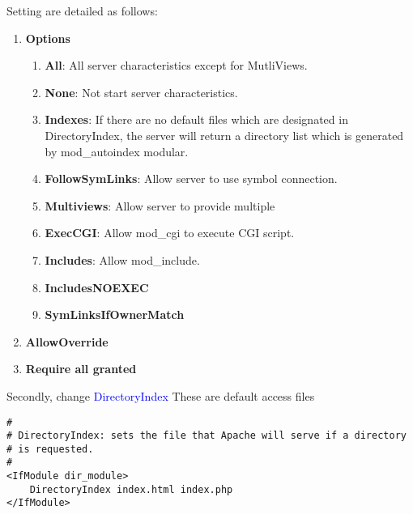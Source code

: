Setting are detailed as follows:
\begin{enumerate}
\item{\textbf{Options}
\begin{enumerate}
\item \textbf{All}: All server characteristics except for MutliViews.
\item \textbf{None}: Not start server characteristics.
\item \textbf{Indexes}: If there are no default files which are designated in DirectoryIndex, the server will return a directory list which is generated by mod\_autoindex modular.
\item \textbf{FollowSymLinks}: Allow server to use symbol connection.
\item \textbf{Multiviews}: Allow server to provide multiple 
\item \textbf{ExecCGI}: Allow mod\_cgi to execute CGI script.
\item \textbf{Includes}: Allow mod\_include.
\item \textbf{IncludesNOEXEC}
\item \textbf{SymLinksIfOwnerMatch}
\end{enumerate}
}
\item{\textbf{AllowOverride}}
\item{\textbf{Require all granted}}
\end{enumerate}

Secondly, change \textcolor{blue}{DirectoryIndex}
These are default access files
\begin{lstlisting}
#
# DirectoryIndex: sets the file that Apache will serve if a directory
# is requested.
#
<IfModule dir_module>
    DirectoryIndex index.html index.php
</IfModule>
\end{lstlisting}


